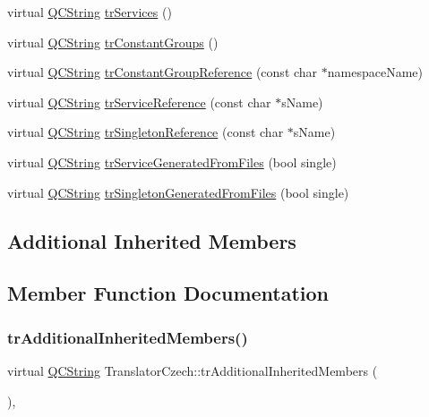 \begin{DoxyCompactItemize}
\item 
virtual \mbox{\hyperlink{class_q_c_string}{Q\+C\+String}} \mbox{\hyperlink{class_translator_czech_afa1c7b06166b3b37e17e2b050e51e811}{tr\+Services}} ()
\item 
virtual \mbox{\hyperlink{class_q_c_string}{Q\+C\+String}} \mbox{\hyperlink{class_translator_czech_a2867d4779cd8a9c86eb592ea8373063c}{tr\+Constant\+Groups}} ()
\item 
virtual \mbox{\hyperlink{class_q_c_string}{Q\+C\+String}} \mbox{\hyperlink{class_translator_czech_a98f04e9b3a3abd710fd36bd280ee2882}{tr\+Constant\+Group\+Reference}} (const char $\ast$namespace\+Name)
\item 
virtual \mbox{\hyperlink{class_q_c_string}{Q\+C\+String}} \mbox{\hyperlink{class_translator_czech_a3506cc838ca852d88ce584d6005d5c5e}{tr\+Service\+Reference}} (const char $\ast$s\+Name)
\item 
virtual \mbox{\hyperlink{class_q_c_string}{Q\+C\+String}} \mbox{\hyperlink{class_translator_czech_a976ecfab48ca3c52f18d7d0736d3d8b1}{tr\+Singleton\+Reference}} (const char $\ast$s\+Name)
\item 
virtual \mbox{\hyperlink{class_q_c_string}{Q\+C\+String}} \mbox{\hyperlink{class_translator_czech_ae948f0820bce650419e4770080f5ee9b}{tr\+Service\+Generated\+From\+Files}} (bool single)
\item 
virtual \mbox{\hyperlink{class_q_c_string}{Q\+C\+String}} \mbox{\hyperlink{class_translator_czech_ad3a3896e272c126e340014c82e796830}{tr\+Singleton\+Generated\+From\+Files}} (bool single)
\end{DoxyCompactItemize}
\subsection*{Additional Inherited Members}


\subsection{Member Function Documentation}
\mbox{\label{class_translator_czech_a52803f80796ce4469cd5fb8c16a53b7e}} 
\subsubsection{\texorpdfstring{trAdditionalInheritedMembers()}{trAdditionalInheritedMembers()}}
{\footnotesize\ttfamily virtual \mbox{\hyperlink{class_q_c_string}{Q\+C\+String}} Translator\+Czech\+::tr\+Additional\+Inherited\+Members (\begin{DoxyParamCaption}{ }\end{DoxyParamCaption})\hspace{0.3cm}{\ttfamily [inline]}, {\ttfamily [virtual]}}

